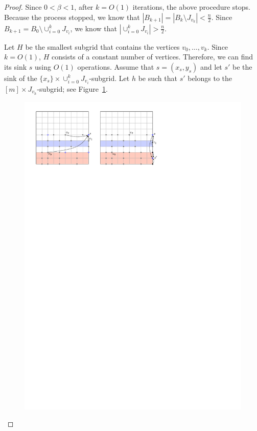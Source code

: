 \documentclass[a4paper,10pt]{article}
\begin{document}
\begin{proof}
Since $0 < \beta < 1$, after $k = O(1)$ iterations, the above procedure stops. 
Because the process stopped, we know that $|B_{k+1}| = |B_k \setminus J_{v_k}| <  \frac{n}{2}$.
Since $B_{k+1} = B_0\setminus \cup_{i=0}^k J_{v_i}$, we know that $|\cup_{i=0}^k J_{v_i}| >  \frac{n}{2}$.

Let $H$ be the smallest subgrid that contains the vertices $v_0, \ldots, v_k$. Since $k = O(1)$, $H$ consists of a constant number of vertices. Therefore, we can find its sink $s$ using $O(1)$ operations. 
Assume that $s = (x_s, y_s)$ and let $s'$ be the sink of the $\{x_s\}\times \cup_{i=0}^k J_{v_i}$-subgrid. 
Let $h$ be such that $s'$ belongs to the $[m]\times J_{v_h}$-subgrid; see Figure~\ref{fig:Climbing Lemma-2}.

\begin{figure}[h]
\centering
\includegraphics[width=1\textwidth]{ClimbingLemma-2.pdf}
\caption{\small }
\label{fig:Climbing Lemma-2}
\end{figure}


\end{proof}
\end{document}

